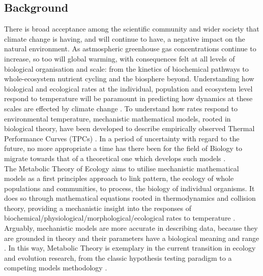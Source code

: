 \documentclass[11pt]{article}
\begin{document}
        \subsection{Background}
        There is broad acceptance among the scientific community and wider society that climate change is having, and will continue to have, a negative impact on the natural environment. As astmospheric greenhouse gas concentrations continue to increase, so too will global warming, with consequences felt at all levels of biological organisation and scale: from the kinetics of biochemical pathways to whole-ecosystem nutrient cycling and the biosphere beyond. Understanding how biological and ecological rates at the individual, population and ecosystem level respond to temperature will be paramount in predicting how dynamics at these scales are effected by climate change . To understand how rates respond to environmental temperature, mechanistic mathematical models, rooted in biological theory, have been developed to describe empirically observed Thermal Performance Curves (TPCs) .
        In a period of uncertainty with regard to the future, no more appropriate a time has there been for the field of Biology to migrate towards that of a theoretical one which develops such models \cite{michaletz2018evaluating}.
        \\
        The Metabolic Theory of Ecology aims to utilise mechanistic mathematical models as a first principles approach to link pattern, the ecology of whole populations and communities, to process, the biology of individual organisms. It does so through mathematical equations rooted in thermodynamics and collision theory, providing a mechanistic insight into the responses of biochemical/physiological/morphological/ecological rates to temperature . Arguably, mechanistic models are more accurate in describing data, because they are grounded in theory and their parameters have a biological meaning and range \cite{eskola2009mechanistic}. In this way, Metabolic Theory is exemplary in the current transition in ecology and evolution research, from the classic hypothesis testing paradigm to a competing models methodology \cite{johnson2004model}.
        
\end{document}
